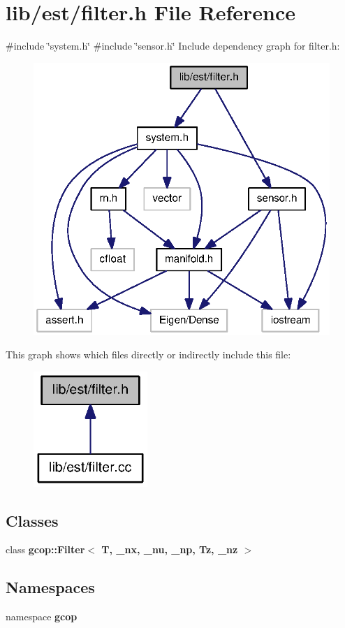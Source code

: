 \section{lib/est/filter.h \-File \-Reference}
\label{filter_8h}
{\ttfamily \#include \char`\"{}system.\-h\char`\"{}}\*
{\ttfamily \#include \char`\"{}sensor.\-h\char`\"{}}\*
\-Include dependency graph for filter.\-h\-:
\nopagebreak
\begin{figure}[H]
\begin{center}
\leavevmode
\includegraphics[width=320pt]{filter_8h__incl}
\end{center}
\end{figure}
\-This graph shows which files directly or indirectly include this file\-:
\nopagebreak
\begin{figure}[H]
\begin{center}
\leavevmode
\includegraphics[width=122pt]{filter_8h__dep__incl}
\end{center}
\end{figure}
\subsection*{\-Classes}
\begin{DoxyCompactItemize}
\item 
class {\bf gcop\-::\-Filter$<$ T, \-\_\-nx, \-\_\-nu, \-\_\-np, Tz, \-\_\-nz $>$}
\end{DoxyCompactItemize}
\subsection*{\-Namespaces}
\begin{DoxyCompactItemize}
\item 
namespace {\bf gcop}
\end{DoxyCompactItemize}
